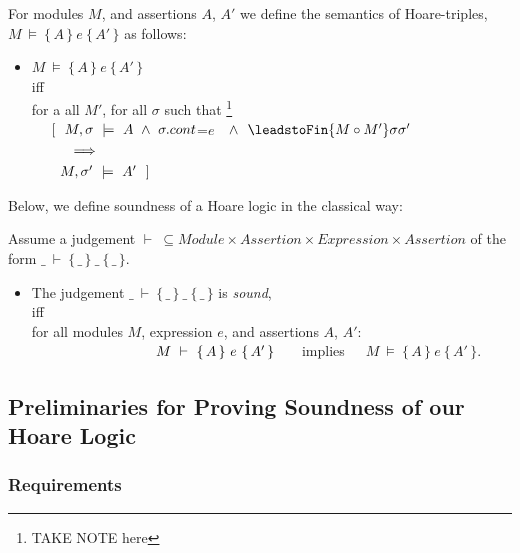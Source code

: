 \begin{definition}

 
For modules $M$, and assertions $A$, $A'$   we define the semantics of Hoare-triples, 
 $M\ \models\  \{\, A \,  \}\ e\  \{\, A' \, \}$ as follows:
\begin{itemize}
\item
$M\ \models\  \{\, A \,  \}\ e\  \{\, A' \, \}$ \\
iff\\
 for a all $M'$, for all $\sigma$ such that \footnote{TAKE NOTE here} \\
$\strut ~ ~ ~ ~ [ \ \ M,\sigma \ \models \ A \ \wedge\  
 \sigma.cont$=$e$ $\ \ \wedge\  \ \leadstoFin  {M\circ M'} \sigma {\sigma'}$
 \\
$\strut ~ ~ ~ ~ \ \  \ \ \Longrightarrow$ \\
$\strut ~ ~ ~ ~ \ \ M,\sigma' \ \models \ A'\ \ ]$
\end{itemize}
\end{definition}
 

Below, we define soundness of a Hoare logic in the classical way:

\begin{definition}

 
Assume a judgement $\vdash \ \subseteq Module \times Assertion \times Expression \times Assertion$ of the form
$\_ \ \vdash\  \{\, \_ \,  \}\ \_ \  \{\, \_ \, \}$.\\
\begin{itemize}
\item
The judgement $\_ \ \vdash\  \{\, \_ \,  \}\ \_ \  \{\, \_ \, \}$ is {\emph {sound}}, \\ iff \\
for all modules $M$, expression $e$, and assertions $A$, $A'$:\\
$\strut\hspace{3cm} \ M\ \vdash\  \{\, A \,  \}\ e\  \{\, A' \, \}$ \ \ \  implies\ \ \ 
 $M\ \models\  \{\, A \,  \}\ e\  \{\, A' \, \}$.
\end{itemize}
 \end{definition}
 
 
 \subsection{Preliminaries for Proving Soundness of our Hoare Logic}
 
 \subsubsection{Requirements}
 

